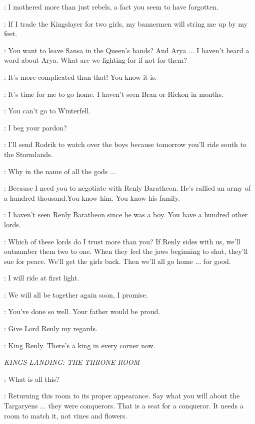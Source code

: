 \CATELYN: I mothered more than just rebels, a fact you seem to have forgotten.

\ROBB: If I trade the Kingslayer for two girls, my bannermen will string me up by my feet.

\CATELYN: You want to leave Sansa in the Queen's hands? And Arya $\ldots$ I haven't heard a word about Arya. What are we fighting for if not for them?

\ROBB: It's more complicated than that! You know it is.

\CATELYN: It's time for me to go home. I haven't seen Bran or Rickon in months.

\ROBB: You can't go to Winterfell.

\CATELYN: I beg your pardon?

\ROBB: I'll send Rodrik to watch over the boys because tomorrow you'll ride south to the Stormlands.

\CATELYN: Why in the name of all the gods $\ldots$

\ROBB: Because I need you to negotiate with Renly Baratheon. He's rallied an army of a hundred thousand.You know him. You know his family.

\CATELYN: I haven't seen Renly Baratheon since he was a boy. You have a hundred other lords.

\ROBB: Which of these lords do I trust more than you? If Renly sides with us, we'll outnumber them two to one. When they feel the jaws beginning to shut, they'll sue for peace. We'll get the girls back. Then we'll all go home $\ldots$ for good.

\CATELYN: I will ride at first light.

\ROBB: We will all be together again soon, I promise.

\CATELYN: You've done so well. Your father would be proud.

\ROBB: Give Lord Renly my regards.

\CATELYN: King Renly. There's a king in every corner now.


\scene

\textit{KINGS LANDING: THE THRONE ROOM}


\CERSEI: What is all this?

\JOFFREY: Returning this room to its proper appearance. Say what you will about the Targaryens $\ldots$ they were conquerors. That is a seat for a conqueror. It needs a room to match it, not vines and flowers.

